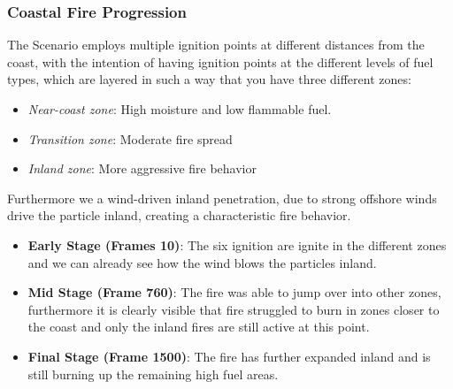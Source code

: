 \subsubsection{Coastal Fire Progression}
The Scenario employs multiple ignition points at different distances from the coast, with the intention of having ignition points at the different levels of fuel types, which are layered in such a way that you have three different zones:
\begin{itemize}
	\item \textit{Near-coast zone}: High moisture and low flammable fuel.
	\item \textit{Transition zone}: Moderate fire spread
	\item \textit{Inland zone}: More aggressive fire behavior
\end{itemize}
Furthermore we a wind-driven inland penetration, due to strong offshore winds drive the particle inland, creating a characteristic fire behavior.
\begin{itemize}
	\item \textbf{Early Stage (Frames 10)}: The six ignition are ignite in the different zones and we can already see how the wind blows the particles inland.
	\item \textbf{Mid Stage (Frame 760)}: The fire was able to jump over into other zones, furthermore it is clearly visible that fire struggled to burn in zones closer to the coast and only the inland fires are still active at this point.
	\item \textbf{Final Stage (Frame 1500)}: The fire has further expanded inland and is still burning up the remaining high fuel areas.
\end{itemize}
